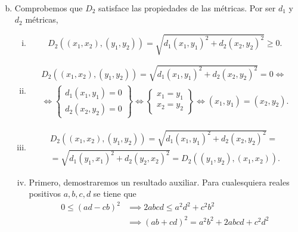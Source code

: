 \begin{eje}
\begin{enumerate}[(a)]
\begin{enumerate}[i)]
\begin{gather*}
            \end{gather*}
        \end{enumerate}
        \item Comprobemos que $D_2$ satisface las propiedades de las métricas. Por ser $d_1$ y $d_2$ métricas,
        \begin{enumerate}[i)]
            \item
            \[
                D_2 \left( \left( x_1, x_2 \right) , \left( y_1 , y_2 \right) \right) = \sqrt{ d_1 \left( x_1, y_1\right) ^2 + d_2 \left( x_2 , y_2 \right)^2 } \geq 0.
            \]
            \item 
            \begin{gather*}
                D_2 \left( \left( x_1, x_2 \right) , \left( y_1 , y_2 \right) \right) = \sqrt{ d_1 \left( x_1, y_1\right) ^2 + d_2 \left( x_2 , y_2 \right)^2 } = 0 \iff \\
                \iff \left\{ \begin{array}{c}
                    d_1 \left( x_1, y_1 \right) = 0 \\
                    d_2 \left( x_2, y_2 \right) = 0
                \end{array} \right\} \iff  \left\{ \begin{array}{c}
                    x_1=y_1 \\
                    x_2=y_2
                \end{array} \right\} \iff \left( x_1, y_1 \right) = \left( x_2, y_2 \right).
            \end{gather*}
            \item 
            \begin{gather*}
                D_2 \left( \left( x_1, x_2 \right) , \left( y_1 , y_2 \right) \right) = \sqrt{ d_1 \left( x_1, y_1\right) ^2 + d_2 \left( x_2 , y_2 \right)^2 } = \\ 
                = \sqrt{ d_1 \left( y_1, x_1\right) ^2 + d_2 \left( y_2 , x_2 \right)^2 } = D_2 \left( \left( y_1, y_2 \right) , \left( x_1 , x_2 \right) \right) .
            \end{gather*}
            \item Primero, demostraremos un resultado auxiliar. Para cualesquiera reales positivos $a, b, c, d$ se tiene que
            \begin{align} \nonumber
                0 \leq \left( ad -cb \right) ^2 &\implies 2abcd \leq a^2d^2+c^2b^2 \\  \nonumber
                &\implies \left( ab+cd \right) ^2 = a^2b^2 + 2abcd + c^2d^2 \\ \nonumber

\end{align}
\end{enumerate}
\end{enumerate}
\end{eje}
